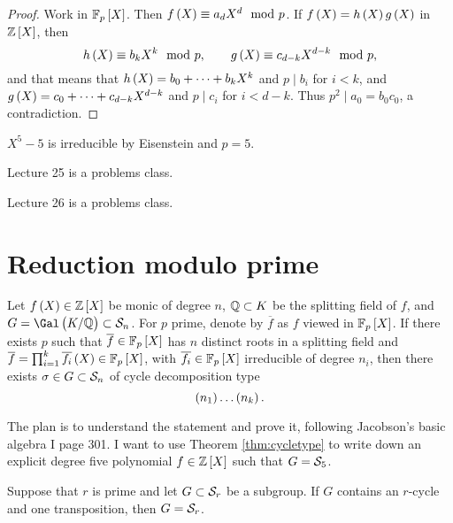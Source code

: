 \begin{proof}
Work in $ \FF_p\sbr{X} $. Then $ f\br{X} \equiv a_dX^d \mod p $. If $ f\br{X} = h\br{X}g\br{X} $ in $ \ZZ\sbr{X} $, then
$$ h\br{X} \equiv b_kX^k \mod p, \qquad g\br{X} \equiv c_{d - k}X^{d - k} \mod p, $$
and that means that $ h\br{X} = b_0 + \dots + b_kX^k $ and $ p \mid b_i $ for $ i < k $, and $ g\br{X} = c_0 + \dots + c_{d - k}X^{d - k} $ and $ p \mid c_i $ for $ i < d - k $. Thus $ p^2 \mid a_0 = b_0c_0 $, a contradiction.
\end{proof}

\begin{example*}
$ X^5 - 5 $ is irreducible by Eisenstein and $ p = 5 $.
\end{example*}


Lecture 25 is a problems class.


Lecture 26 is a problems class.

\pagebreak

\section{Reduction modulo prime}


\begin{theorem}
\label{thm:cycletype}
Let $ f\br{X} \in \ZZ\sbr{X} $ be monic of degree $ n $, $ \mathbb{Q} \subset K $ be the splitting field of $ f $, and $ G = \Gal\br{K / \QQ} \subset \SSS_n $. For $ p $ prime, denote by $ \overline{f} $ as $ f $ viewed in $ \FF_p\sbr{X} $. If there exists $ p $ such that $ \overline{f} \in \FF_p\sbr{X} $ has $ n $ distinct roots in a splitting field and $ \overline{f} = \prod_{i = 1}^k \overline{f_i}\br{X} \in \FF_p\sbr{X} $, with $ \overline{f_i} \in \FF_p\sbr{X} $ irreducible of degree $ n_i $, then there exists $ \sigma \in G \subset \mathcal{S}_n $ of cycle decomposition type
$$ \br{n_1} \dots \br{n_k}. $$
\end{theorem}

The plan is to understand the statement and prove it, following Jacobson's basic algebra I page 301. I want to use Theorem \ref{thm:cycletype} to write down an explicit degree five polynomial $ f \in \ZZ\sbr{X} $ such that $ G = \mathcal{S}_5 $.

\begin{proposition}
Suppose that $ r $ is prime and let $ G \subset \mathcal{S}_r $ be a subgroup. If $ G $ contains an $ r $-cycle and one transposition, then $ G = \mathcal{S}_r $.
\end{proposition}

